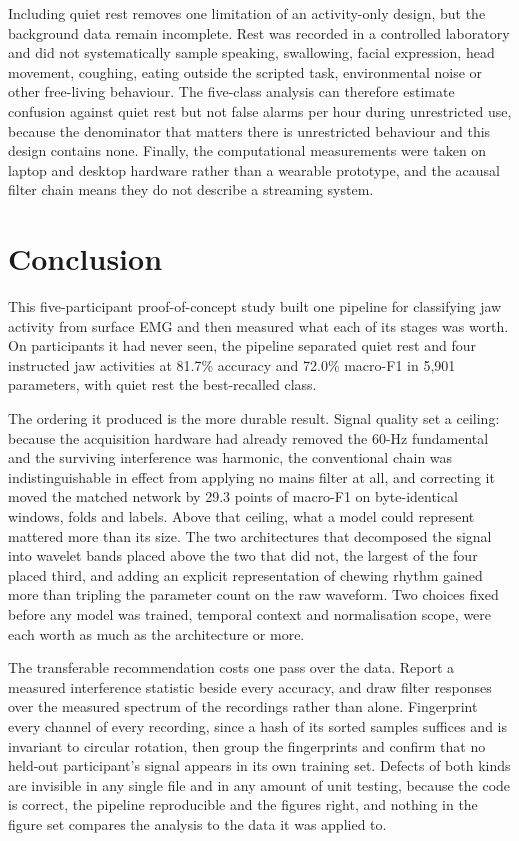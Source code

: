 \documentclass[pdflatex,sn-nature,iicol]{sn-jnl}
\begin{document}
Including quiet rest removes one limitation of an activity-only design, but the background data remain incomplete. Rest was recorded in a controlled laboratory and did not systematically sample speaking, swallowing, facial expression, head movement, coughing, eating outside the scripted task, environmental noise or other free-living behaviour. The five-class analysis can therefore estimate confusion against quiet rest but not false alarms per hour during unrestricted use, because the denominator that matters there is unrestricted behaviour and this design contains none. Finally, the computational measurements were taken on laptop and desktop hardware rather than a wearable prototype, and the acausal filter chain means they do not describe a streaming system.

\section{Conclusion}

This five-participant proof-of-concept study built one pipeline for classifying jaw activity from surface EMG and then measured what each of its stages was worth. On participants it had never seen, the pipeline separated quiet rest and four instructed jaw activities at 81.7\% accuracy and 72.0\% macro-F1 in 5,901 parameters, with quiet rest the best-recalled class.

The ordering it produced is the more durable result. Signal quality set a ceiling: because the acquisition hardware had already removed the 60-Hz fundamental and the surviving interference was harmonic, the conventional chain was indistinguishable in effect from applying no mains filter at all, and correcting it moved the matched network by 29.3 points of macro-F1 on byte-identical windows, folds and labels. Above that ceiling, what a model could represent mattered more than its size. The two architectures that decomposed the signal into wavelet bands placed above the two that did not, the largest of the four placed third, and adding an explicit representation of chewing rhythm gained more than tripling the parameter count on the raw waveform. Two choices fixed before any model was trained, temporal context and normalisation scope, were each worth as much as the architecture or more.

The transferable recommendation costs one pass over the data. Report a measured interference statistic beside every accuracy, and draw filter responses over the measured spectrum of the recordings rather than alone. Fingerprint every channel of every recording, since a hash of its sorted samples suffices and is invariant to circular rotation, then group the fingerprints and confirm that no held-out participant's signal appears in its own training set. Defects of both kinds are invisible in any single file and in any amount of unit testing, because the code is correct, the pipeline reproducible and the figures right, and nothing in the figure set compares the analysis to the data it was applied to.
\end{document}
